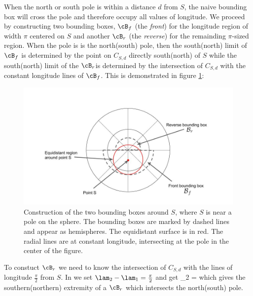 \documentclass[preprint,12pt]{article}
\begin{document}
When the north or south pole is within a distance $d$ from $S$, the naive bounding box will cross the pole and therefore occupy all values of longitude. We proceed by constructing two bounding boxes, $\cB_f$ (the {\it front}) for the longitude region of width $\pi$ centered on $S$ and another $\cB_r$ (the {\it reverse}) for the remainding $\pi$-sized region. When the pole is is the north(south) pole, then the south(north) limit of $\cB_f$ is determined by the point on $C_{S,d}$ directly south(north) of $S$ while the south(north) limit of the $\cB_r$is determined by the intersection of $C_{S,d}$ with the constant longitude lines of $\cB_f$. This is demonstrated in figure \ref{fig:bbox_reverse}:
\begin{figure}[bth!]
  \includegraphics[width=\linewidth]{bbox_reverse}
  \caption{Construction of the two bounding boxes around $S$, where $S$ is near a pole on the sphere. The bounding boxes are marked by dashed lines and appear as hemispheres.  The equidistant surface is in red. The radial lines are at constant longitude, intersecting at the pole in the center of the figure.}
  \label{fig:bbox_reverse}
\end{figure}

To constuct $\cB_r$ we need to know the intersection of $C_{S,d}$ with the lines of longitude $\frac{\pi}{2}$ from $S$. In  we set $\lam_2-\lam_1=\frac{\pi}{2}$ and get
\be
\sin \vphi_2 =
\ee 
which gives the southern(northern) extremity of a $\cB_r$ which intersects the north(south) pole.

 


\end{document}
